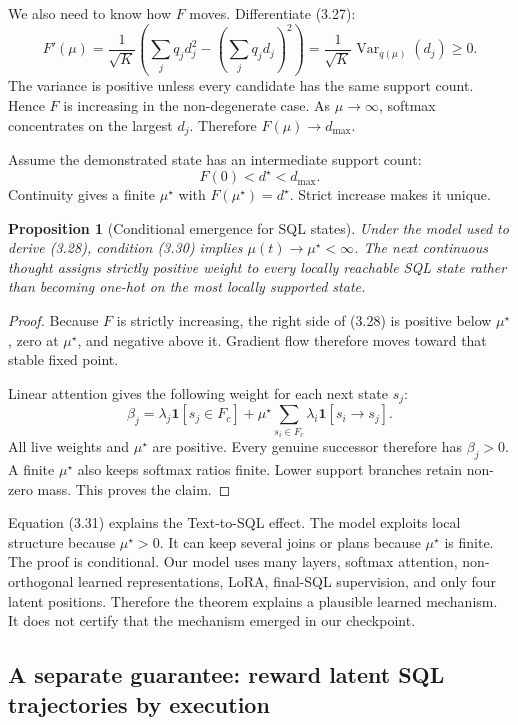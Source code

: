 \documentclass[11pt]{article}
\newtheorem{proposition}[theorem]{Proposition}
\theoremstyle{definition}
\begin{document}
We also need to know how $F$ moves. Differentiate (3.27):
\[
F'(\mu)=\frac{1}{\sqrt K}
\left(\sum_jq_jd_j^2-\left(\sum_jq_jd_j\right)^2\right)
=\frac{1}{\sqrt K}\operatorname{Var}_{q(\mu)}(d_j)\ge0.
\tag{3.29}
\]
The variance is positive unless every candidate has the same support count. Hence $F$ is increasing in the non-degenerate case. As $\mu\to\infty$, softmax concentrates on the largest $d_j$. Therefore $F(\mu)\to d_{\max}$.

Assume the demonstrated state has an intermediate support count:
\[
F(0)<d^\star<d_{\max}.
\tag{3.30}
\]
Continuity gives a finite $\mu^\star$ with $F(\mu^\star)=d^\star$. Strict increase makes it unique.

\begin{proposition}[Conditional emergence for SQL states]
Under the model used to derive (3.28), condition (3.30) implies $\mu(t)\to\mu^\star<\infty$. The next continuous thought assigns strictly positive weight to every locally reachable SQL state rather than becoming one-hot on the most locally supported state.
\end{proposition}

\begin{proof}
Because $F$ is strictly increasing, the right side of (3.28) is positive below $\mu^\star$, zero at $\mu^\star$, and negative above it. Gradient flow therefore moves toward that stable fixed point.

Linear attention gives the following weight for each next state $s_j$:
\[
\beta_j=\lambda_j\mathbf 1[s_j\in F_c]
+\mu^\star\sum_{s_i\in F_c}\lambda_i\mathbf 1[s_i\to s_j].
\tag{3.31}
\]
All live weights and $\mu^\star$ are positive. Every genuine successor therefore has $\beta_j>0$. A finite $\mu^\star$ also keeps softmax ratios finite. Lower support branches retain non-zero mass. This proves the claim.
\end{proof}

Equation (3.31) explains the Text-to-SQL effect. The model exploits local structure because $\mu^\star>0$. It can keep several joins or plans because $\mu^\star$ is finite. The proof is conditional. Our model uses many layers, softmax attention, non-orthogonal learned representations, LoRA, final-SQL supervision, and only four latent positions. Therefore the theorem explains a plausible learned mechanism. It does not certify that the mechanism emerged in our checkpoint.

\subsection{A separate guarantee: reward latent SQL trajectories by execution}
\end{document}
